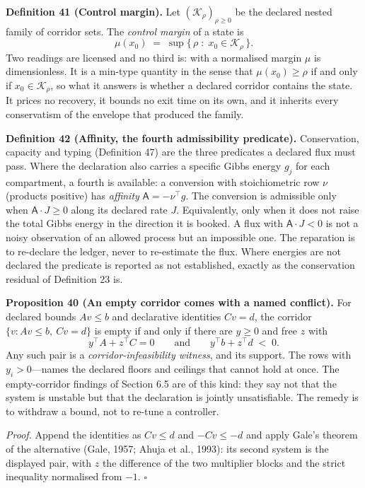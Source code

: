 \documentclass[11pt]{article}
\begin{document}
\textbf{Definition 41 (Control margin).} Let \((\mathcal K_\rho)_{\rho \ge 0}\) be the declared nested family of corridor sets. The \emph{control margin} of a state is \[ \mu(x_0) \;=\; \sup\{\, \rho \;:\; x_0 \in \mathcal K_\rho \,\}. \] Two readings are licensed and no third is: with a normalised margin \(\mu\) is dimensionless. It is a min-type quantity in the sense that \(\mu(x_0) \ge \rho\) if and only if \(x_0 \in \mathcal K_\rho\), so what it answers is whether a declared corridor contains the state. It prices no recovery, it bounds no exit time on its own, and it inherits every conservatism of the envelope that produced the family.

\textbf{Definition 42 (Affinity, the fourth admissibility predicate).} Conservation, capacity and typing (Definition 47) are the three predicates a declared flux must pass. Where the declaration also carries a specific Gibbs energy \(g_j\) for each compartment, a fourth is available: a conversion with stoichiometric row \(\nu\) (products positive) has \emph{affinity} \(\mathsf{A} = -\nu^{\top} g\). The conversion is admissible only when \(\mathsf{A} \cdot J \ge 0\) along its declared rate \(J\). Equivalently, only when it does not raise the total Gibbs energy in the direction it is booked. A flux with \(\mathsf{A} \cdot J < 0\) is not a noisy observation of an allowed process but an impossible one. The reparation is to re-declare the ledger, never to re-estimate the flux. Where energies are not declared the predicate is reported as not established, exactly as the conservation residual of Definition 23 is.

\textbf{Proposition 40 (An empty corridor comes with a named conflict).} For declared bounds \(A v \le b\) and declarative identities \(C v = d\), the corridor \(\{v : A v \le b,\ C v = d\}\) is empty if and only if there are \(y \ge 0\) and free \(z\) with \[
y^{\top} A + z^{\top} C = 0 \qquad \text{and} \qquad y^{\top} b + z^{\top} d \;<\; 0 .
\] Any such pair is a \emph{corridor-infeasibility witness}, and its support. The rows with \(y_i > 0\)---names the declared floors and ceilings that cannot hold at once. The empty-corridor findings of Section 6.5 are of this kind: they say not that the system is unstable but that the declaration is jointly unsatisfiable. The remedy is to withdraw a bound, not to re-tune a controller.

\emph{Proof.} Append the identities as \(C v \le d\) and \(-C v \le -d\) and apply Gale's theorem of the
alternative (Gale, 1957; Ahuja et al., 1993): its second system is the displayed pair, with \(z\) the
difference of the two multiplier blocks and the strict inequality normalised from \(-1\). \ensuremath{\square}
\end{document}
